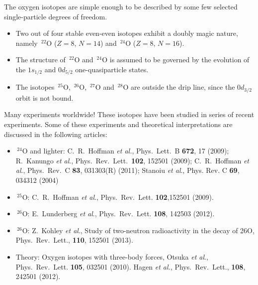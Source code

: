 \documentclass[%
oneside,                 %
final,                   %
10pt]{article}
\begin{document}
The oxygen isotopes are simple enough to be described by some few selected single-particle degrees of freedom.  

\begin{itemize}
\item Two out of four stable even-even isotopes exhibit a doubly magic nature, namely $\,{}^{22}\mbox{O}$ ($Z=8$, $N=14$) and $\,{}^{24}\mbox{O}$ ($Z=8$, $N=16$).

\item The structure of $\,{}^{22}\mbox{O}$ and $\,{}^{24}\mbox{O}$ is assumed to be governed by the evolution of the $1s_{1/2}$ and $0d_{5/2}$  one-quasiparticle states.

\item The isotopes $\,{}^{25}\mbox{O}$, $\,{}^{26}\mbox{O}$, $\,{}^{27}\mbox{O}$ and $\,{}^{28}\mbox{O}$ are outside the drip line, since the $0d_{3/2}$ orbit is not bound.
\end{itemize}

\noindent
 Many experiments worldwide!
These isotopes have been studied in series of recent experiments. Some of these experiments and theoretical interpretations are discussed in the following articles:

\begin{itemize}
\item $\,{}^{24}\mbox{O}$ and lighter:  C.~R.~Hoffman \emph{et al.}, Phys.~Lett.~B \textbf{672}, 17 (2009); R.~Kanungo \emph{et al}., Phys.~Rev.~Lett.~\textbf{102}, 152501 (2009); C.~R.~Hoffman \emph{et al}., Phys.~Rev.~C \textbf{83}, 031303(R) (2011); Stanoiu \emph{et al}., Phys. Rev. C \textbf{69}, 034312 (2004)

\item $\,{}^{25}\mbox{O}$: C.~R.~Hoffman \emph{et al}., Phys.~Rev.~Lett. \textbf{102},152501  (2009). 

\item $\,{}^{26}\mbox{O}$: E.~Lunderberg \emph{et al}., Phys.~Rev.~Lett. \textbf{108}, 142503 (2012). 

\item $\,{}^{26}\mbox{O}$: Z.~Kohley  \emph{et al}., Study of two-neutron radioactivity in the decay of 26O, Phys.~Rev.~Lett., \textbf{110}, 152501 (2013). 

\item Theory: Oxygen isotopes with three-body forces,  Otsuka \emph{et al}., Phys.~Rev.~Lett. \textbf{105}, 032501  (2010).  Hagen \emph{et al.}, Phys.~Rev.~Lett., \textbf{108}, 242501 (2012). 
\end{itemize}
\end{document}

